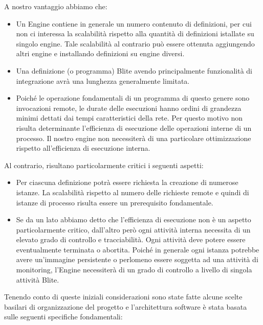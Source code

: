 A nostro vantaggio abbiamo che:
\begin{itemize}
  \item Un Engine contiene in generale un numero contenuto di definizioni, per
  cui non ci interessa la scalabilità rispetto alla quantità di definizioni
  istallate su singolo engine. Tale scalabilità al contrario può essere
  ottenuta aggiungendo altri engine e installando definizioni su engine diversi.
  
  \item  Una definizione (o programma) Blite avendo principalmente funzionalità
  di integrazione avrà una lunghezza generalmente limitata. 
  
  \item Poiché le operazione fondamentali di un programma di questo genere
  sono invocazioni remote, le durate delle esecuzioni hanno ordini di grandezza
  minimi dettati dai tempi caratteristici della rete. Per questo motivo non
  risulta determinante l'efficienza di esecuzione delle operazioni interne di un
  processo. Il nostro engine non necessiterà di una particolare ottimizzazione 
  rispetto all'efficienza di esecuzione interna.
\end{itemize}

Al contrario, risultano particolarmente critici i seguenti aspetti:
\begin{itemize}
  \item Per ciascuna definizione potrà essere richiesta la creazione di
  numerose istanze. La scalabilità rispetto al numero delle
  richieste remote e quindi di istanze di processo risulta essere un
  prerequisito fondamentale.
  
  \item Se da un lato abbiamo detto che l'efficienza di esecuzione non \`e 
  un aspetto particolarmente critico, dall'altro per\`o ogni attività interna
  necessita di un elevato grado di controllo e tracciabilità. Ogni attività deve
  potere essere eventualmente terminata o abortita. Poiché in generale
  ogni istanza potrebbe avere un'immagine persistente o
  perlomeno essere soggetta ad una attività di monitoring, l'Engine necessiterà
  di un grado di controllo a livello di singola attività Blite.
\end{itemize}

Tenendo conto di queste iniziali considerazioni sono state fatte alcune scelte
basilari di organizzazione del progetto e l'architettura software \`e stata
basata sulle seguenti specifiche fondamentali:

